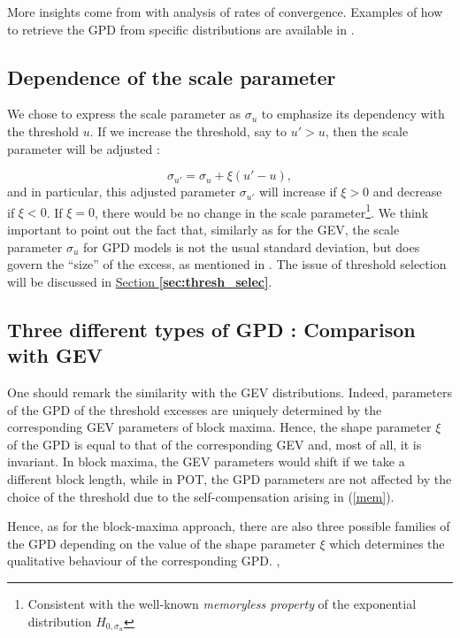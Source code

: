 More insights come from \citet[pp.27-28]{reiss_statistical_2007} with analysis of rates of convergence. Examples of how to retrieve the GPD from specific distributions are available in \citet[pp.77]{coles_introduction_2001}.


\subsection{Dependence of the scale parameter } We chose to express the scale parameter as $\sigma_u$ to emphasize its dependency with the threshold $u$. If we increase the threshold, say to $u'>u$, then the scale parameter will be adjusted :

\begin{equation} \label{mem}
\sigma_{u'}=\sigma_u+\xi (u'-u),
\end{equation}
and in particular, this adjusted parameter $\sigma_{u'}$ will increase if $\xi>0$ and decrease if $\xi<0$.
If $\xi =0$, there would be no change in the scale parameter\footnote{Consistent with the well-known \emph{memoryless property} of the exponential distribution $H_{0,\sigma_u}$}. 
We think important to point out the fact that, similarly as for the GEV, the scale parameter $\sigma_u$ for GPD models
is not the usual standard deviation, but does govern the “size” of the excess, as mentioned in \citet[pp.20]{AghaKouchak_extremes_2013}.
The issue of threshold selection will be discussed in \hyperref[sec:thresh_selec]{Section \textbf{\ref{sec:thresh_selec}}}.


\subsection{Three different types of GPD : Comparison with GEV} 
One should remark the similarity with the GEV distributions. Indeed, parameters of the GPD of the threshold excesses are uniquely determined by the corresponding GEV parameters of block maxima. Hence, the shape parameter $\xi$ of the GPD is equal to that of the corresponding GEV and, most of all, it is invariant.
 In block maxima, the GEV parameters  would shift if we take a different block length, while in POT, the GPD  parameters are not affected by the choice of the threshold due to the self-compensation arising in (\ref{mem}).%

Hence, as for the block-maxima approach, there are also three possible families of the GPD depending on the value of the shape parameter $\xi$ which determines the qualitative behaviour of the corresponding GPD. \cite{hosking_parameter_1987}, \cite{singh_parameter_1995}


